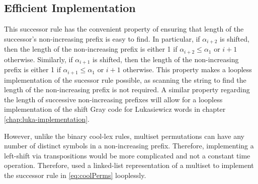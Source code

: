 



\subsection{Efficient Implementation}
This successor rule has the convenient property of ensuring that length of the successor's non-increasing prefix is easy to find.
In particular, if $\alpha_{i+2}$ is shifted, then the length of the non-increasing prefix is either 1 if $\alpha_{i+2}\le \alpha_1$ or $i+1$ otherwise. 
Similarly, if $\alpha_{i+1}$ is shifted, then the length of the non-increasing prefix is either 1 if $\alpha_{i+1}\le \alpha_1$ or $i+1$ otherwise. 
This property makes a loopless implementation of the sucessor rule possible, as scanning the string to find the length of the non-increasing prefix is not required.  
A similar property regarding the length of successive non-increasing prefixes will allow for a loopless implementation of the shift Gray code for Lukasiewicz words in chapter \ref{chap:luka-implementation}.

However, unlike the binary cool-lex rules, multiset permutations can have any number of distinct symbols in a non-increasing prefix.  Therefore, implementing a left-shift via transpositions would be more complicated and  not a constant time operation.  Therefore, \cite{williams2009loopless} used a linked-list representation of a multiset to implement the successor rule in \ref{eq:coolPerms} looplessly.



